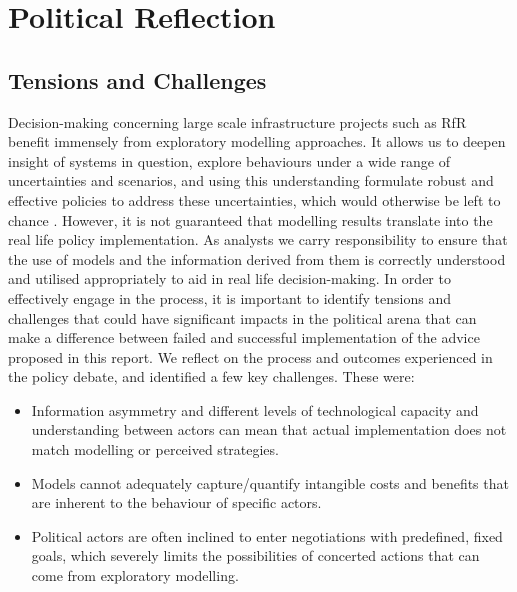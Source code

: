 \section{Political Reflection}
\label{s:poli_reflect}


\subsection{Tensions and Challenges}
Decision-making concerning large scale infrastructure projects such as RfR benefit immensely from exploratory modelling approaches. It allows us to deepen insight of systems in question, explore behaviours under a wide range of uncertainties and scenarios, and using this understanding formulate robust and effective policies to address these uncertainties, which would otherwise be left to chance \parencite{bankes_exploratory_1993}. However, it is not guaranteed that modelling results translate into the real life policy implementation. As analysts we carry responsibility to ensure that the use of models and the information derived from them is correctly understood and utilised appropriately to aid in real life decision-making. In order to effectively engage in the process, it is important to identify tensions and challenges that could have significant impacts in the political arena that can make a difference between failed and successful implementation of the advice proposed in this report. We reflect on the process and outcomes experienced in the policy debate, and identified a few key challenges. These were:
\begin{itemize}
    \item Information asymmetry and different levels of technological capacity and understanding between actors can mean that actual implementation does not match modelling or perceived strategies.
    \item Models cannot adequately capture/quantify intangible costs and benefits that are inherent to the behaviour of specific actors.
    \item Political actors are often inclined to enter negotiations with predefined, fixed goals, which severely limits the possibilities of concerted actions that can come from exploratory modelling.
\end{itemize}

